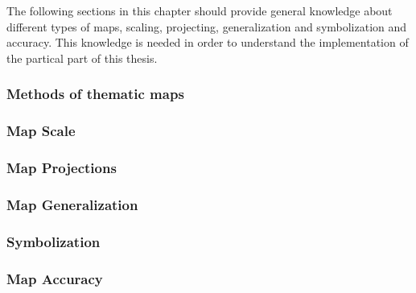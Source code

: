 The following sections in this chapter should provide general knowledge about different types of maps, scaling, projecting, generalization and symbolization and accuracy. This knowledge is needed in order to understand the implementation of the partical part of this thesis.

\subsubsection{Methods of thematic maps}


\subsubsection{Map Scale}
\subsubsection{Map Projections}
\subsubsection{Map Generalization}
\subsubsection{Symbolization}
\subsubsection{Map Accuracy}
\label{s:map-accuracy}
